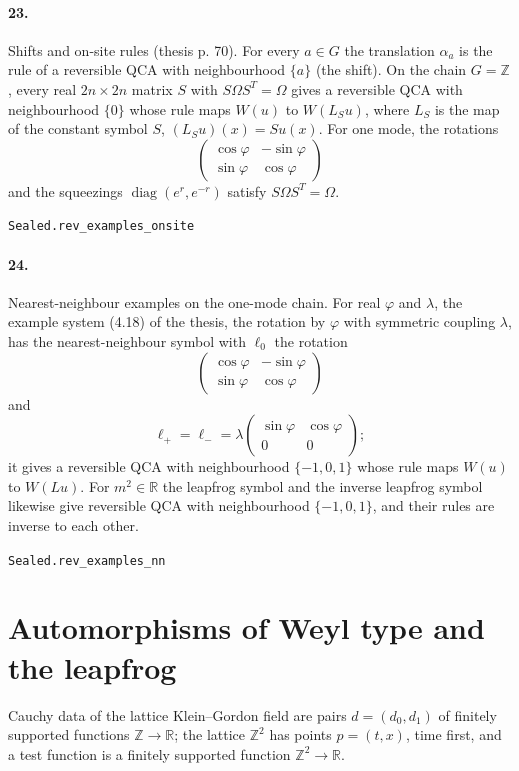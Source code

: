 \documentclass[11pt]{article}
\begin{document}
\paragraph{23.} Shifts and on-site rules (thesis p. 70). For every $a \in G$ the translation $\alpha_a$ is the rule of a reversible QCA with neighbourhood $\{a\}$ (the shift). On the chain $G = \mathbb Z$, every real $2n \times 2n$ matrix $S$ with $S \Omega S^T = \Omega$ gives a reversible QCA with neighbourhood $\{0\}$ whose rule maps $W(u)$ to $W(L_S u)$, where $L_S$ is the map of the constant symbol $S$, $(L_S u)(x) = S u(x)$. For one mode, the rotations \[\begin{pmatrix} \cos\varphi & -\sin\varphi \\ \sin\varphi & \cos\varphi \end{pmatrix}\] and the squeezings $\operatorname{diag}(e^r, e^{-r})$ satisfy $S \Omega S^T = \Omega$.\par{\footnotesize\texttt{Sealed.rev\_examples\_onsite}}

\paragraph{24.} Nearest-neighbour examples on the one-mode chain. For real $\varphi$ and $\lambda$, the example system (4.18) of the thesis, the rotation by $\varphi$ with symmetric coupling $\lambda$, has the nearest-neighbour symbol with $\ell_0$ the rotation \[\begin{pmatrix} \cos\varphi & -\sin\varphi \\ \sin\varphi & \cos\varphi \end{pmatrix}\] and \[\ell_+ = \ell_- = \lambda \begin{pmatrix} \sin\varphi & \cos\varphi \\ 0 & 0 \end{pmatrix};\] it gives a reversible QCA with neighbourhood $\{-1, 0, 1\}$ whose rule maps $W(u)$ to $W(L u)$. For $m^2 \in \mathbb R$ the leapfrog symbol and the inverse leapfrog symbol likewise give reversible QCA with neighbourhood $\{-1, 0, 1\}$, and their rules are inverse to each other.\par{\footnotesize\texttt{Sealed.rev\_examples\_nn}}

\section*{Automorphisms of Weyl type and the leapfrog}
Cauchy data of the lattice Klein–Gordon field are pairs $d = (d_0, d_1)$ of finitely supported functions $\mathbb Z \to \mathbb R$; the lattice $\mathbb Z^2$ has points $p = (t, x)$, time first, and a test function is a finitely supported function $\mathbb Z^2 \to \mathbb R$.
\end{document}
